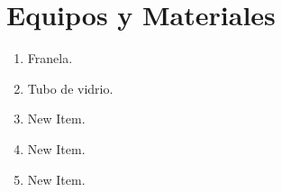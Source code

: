 \section{Equipos y Materiales}
\begin{enumerate}[label=\itemcirccz{azzul}{\alph*},itemsep=2pt,partopsep=6pt]
	\item Franela.
	\item Tubo de vidrio.
	\item {\color{morado01} New Item.}
	\item {\color{morado01} New Item.}
	\item {\color{morado01} New Item.}
\end{enumerate}



